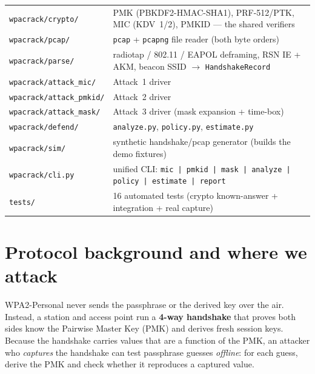 \documentclass[11pt,a4paper]{article}
\newcommand{\code}[1]{\texttt{#1}}
\begin{document}
\begin{center}
\small
\begin{tabularx}{\textwidth}{@{}l X@{}}
\toprule
\code{wpacrack/crypto/} & PMK (PBKDF2-HMAC-SHA1), PRF-512/PTK, MIC (KDV~1/2), PMKID --- the shared verifiers \\
\code{wpacrack/pcap/} & \code{pcap} + \code{pcapng} file reader (both byte orders) \\
\code{wpacrack/parse/} & radiotap / 802.11 / EAPOL deframing, RSN IE + AKM, beacon SSID $\to$ \code{HandshakeRecord} \\
\code{wpacrack/attack\_mic/} & Attack~1 driver \\
\code{wpacrack/attack\_pmkid/} & Attack~2 driver \\
\code{wpacrack/attack\_mask/} & Attack~3 driver (mask expansion + time-box) \\
\code{wpacrack/defend/} & \code{analyze.py}, \code{policy.py}, \code{estimate.py} \\
\code{wpacrack/sim/} & synthetic handshake/pcap generator (builds the demo fixtures) \\
\code{wpacrack/cli.py} & unified CLI: \code{mic\,|\,pmkid\,|\,mask\,|\,analyze\,|\,policy\,|\,estimate\,|\,report} \\
\code{tests/} & 16 automated tests (crypto known-answer + integration + real capture) \\
\bottomrule
\end{tabularx}
\end{center}

\section{Protocol background and where we attack}

WPA2-Personal never sends the passphrase or the derived key over the air. Instead, a station
and access point run a \textbf{4-way handshake} that proves both sides know the Pairwise Master
Key (PMK) and derives fresh session keys. Because the handshake carries values that are a
function of the PMK, an attacker who \emph{captures} the handshake can test passphrase guesses
\emph{offline}: for each guess, derive the PMK and check whether it reproduces a captured value.
\end{document}
